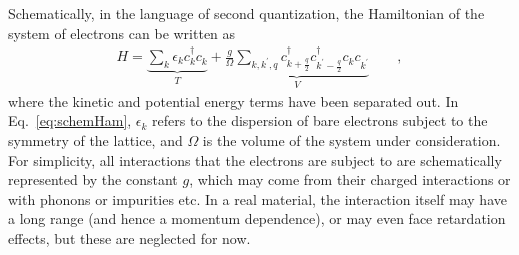 \par 
Schematically, in the language of second quantization, the Hamiltonian of the system of electrons can be written as 
\begin{align}
    H = \underbrace{\sum_k \epsilon_k c^\dagger_k c^{\phantom{\dagger}}_k}_{T} + \underbrace{\frac{g}{\Omega}\sum_{k,k^\prime,q} c^\dagger_{k+\frac{q}{2}}c^\dagger_{k^\prime -\frac{q}{2}}c^{\phantom{\dagger}}_k c^{\phantom{\dagger}}_{k^\prime}}_{V} \quad\quad, 
    \label{eq:schemHam}
\end{align}
where the kinetic and potential energy terms have been separated out. In Eq.~\eqref{eq:schemHam}, $\epsilon_k$ refers to the dispersion of bare electrons subject to the symmetry of the lattice, and $\Omega$ is the volume of the system under consideration. For simplicity, all interactions that the electrons are subject to are schematically represented by the constant $g$, which may come from their charged interactions or with phonons or impurities etc. In a real material, the interaction itself may have a long range (and hence a momentum dependence), or may even face retardation effects, but these are neglected for now. 

